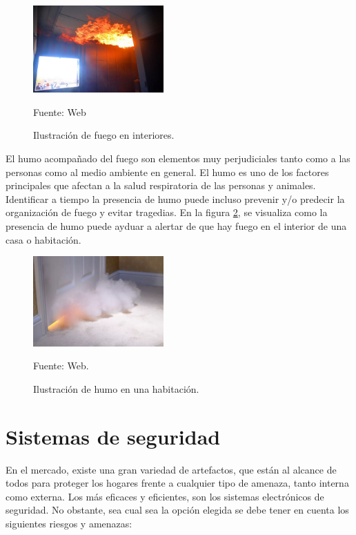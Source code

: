 \begin{figure}[H]
    \begin{center}
        \includegraphics[width=5cm]{img/capitulo_3/fuego_en_interiores.jpg}
    \end{center}
    \begin{center}
        \caption{Ilustración de fuego en interiores.} 
        Fuente: Web 
        \label{fig:fuego}
    \end{center}
\end{figure}

El humo acompañado del fuego son elementos muy perjudiciales tanto como a las personas como al medio ambiente en general. El humo es uno de los factores principales que afectan a la salud respiratoria de las personas y animales. Identificar a tiempo la presencia de humo puede incluso prevenir y/o predecir la organización de fuego y evitar tragedias. En la figura \ref{fig:humo}, se visualiza como la presencia de humo puede ayduar a alertar de que hay fuego en el interior de una casa o habitación.\\

\begin{figure}[H]
    \begin{center}
        \includegraphics[width=5cm]{img/capitulo_3/fuego_en_el_cuarto.jpg}
    \end{center}
    \begin{center}
        \caption{Ilustración de humo en una habitación.}
        Fuente: Web.
        \label{fig:humo}
    \end{center}
\end{figure}

\section{Sistemas de seguridad}
En el mercado, existe una gran variedad de artefactos, que están al alcance de todos para proteger los hogares frente a cualquier tipo de amenaza, tanto interna como externa. Los más eficaces y eficientes, son los sistemas electrónicos de seguridad. No obstante, sea cual sea la opción elegida se debe tener en cuenta los siguientes riesgos y amenazas:\\

